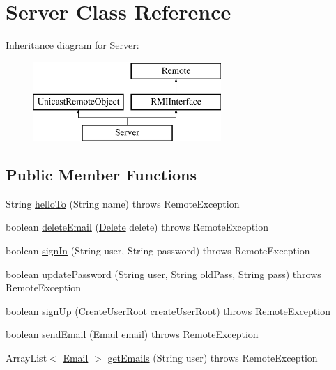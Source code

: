 \hypertarget{class_server}{}\section{Server Class Reference}
\label{class_server}
Inheritance diagram for Server\+:\begin{figure}[H]
\begin{center}
\leavevmode
\includegraphics[height=3.000000cm]{class_server}
\end{center}
\end{figure}
\subsection*{Public Member Functions}
\begin{DoxyCompactItemize}
\item 
String \hyperlink{class_server_a5bb8a4d74a82c7e2590de523648fa3ab}{hello\+To} (String name)  throws Remote\+Exception 
\item 
boolean \hyperlink{class_server_ad679fc8c7704690482684e42cc15c740}{delete\+Email} (\hyperlink{class_delete}{Delete} delete)  throws Remote\+Exception
\item 
boolean \hyperlink{class_server_a817e1af39aeac07664ce011c44013e55}{sign\+In} (String user, String password)  throws Remote\+Exception 
\item 
boolean \hyperlink{class_server_a729c6728075152e3550160273869e992}{update\+Password} (String user, String old\+Pass, String pass)  throws Remote\+Exception 
\item 
boolean \hyperlink{class_server_a9e4fcd4cc8bfb0484735adfcf38be657}{sign\+Up} (\hyperlink{class_create_user_root}{Create\+User\+Root} create\+User\+Root)  throws Remote\+Exception 
\item 
boolean \hyperlink{class_server_a4c26769f2867086519a196bc92502af6}{send\+Email} (\hyperlink{class_email}{Email} email)  throws Remote\+Exception 
\item 
Array\+List$<$ \hyperlink{class_email}{Email} $>$ \hyperlink{class_server_a348f49650335ef5341a4d960d6adac2e}{get\+Emails} (String user)  throws Remote\+Exception 
\end{DoxyCompactItemize}
